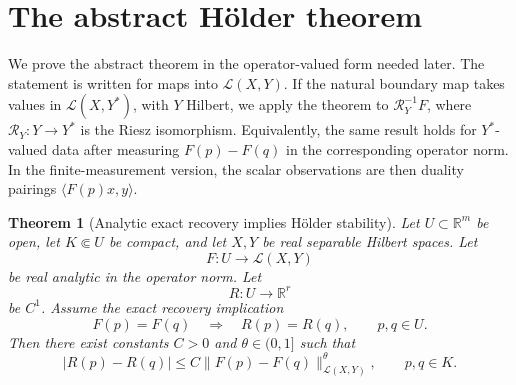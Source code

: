 \documentclass[12pt,oneside]{amsart}
\newtheorem{theorem}{Theorem}[section]
\newcommand{\R}{\mathbb R}
\newcommand{\cL}{\mathcal L}
\newcommand{\dual}[2]{\langle #1,#2\rangle}
\begin{document}
\section{The abstract H\"older theorem}\label{sec:abstract}

We prove the abstract theorem in the operator-valued form needed later.  The statement is written for maps into \(\cL(X,Y)\).  If the natural boundary map takes values in \(\cL(X,Y^*)\), with \(Y\) Hilbert, we apply the theorem to \(\mathcal R_Y^{-1}F\), where \(\mathcal R_Y:Y\to Y^*\) is the Riesz isomorphism.  Equivalently, the same result holds for \(Y^*\)-valued data after measuring \(F(p)-F(q)\) in the corresponding operator norm.  In the finite-measurement version, the scalar observations are then duality pairings \(\dual{F(p)x}{y}\).

\begin{theorem}[Analytic exact recovery implies H\"older stability]\label{thm:abstract-holder}
Let $U\subset\R^m$ be open, let $K\Subset U$ be compact, and let $X,Y$ be real separable Hilbert spaces.  Let
\[
        F:U\to\cL(X,Y)
\]
be real analytic in the operator norm.  Let
\[
        R:U\to\R^r
\]
be $C^1$.  Assume the exact recovery implication
\begin{equation}\label{eq:exact-recovery}
        F(p)=F(q) \quad\Longrightarrow\quad R(p)=R(q),
        \qquad p,q\in U .
\end{equation}
Then there exist constants $C>0$ and $\theta\in(0,1]$ such that
\begin{equation}\label{eq:abstract-holder}
        |R(p)-R(q)|
        \le C\|F(p)-F(q)\|_{\cL(X,Y)}^\theta,
        \qquad p,q\in K .
\end{equation}
\end{theorem}
\end{document}
